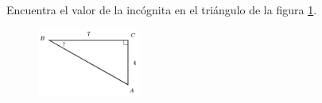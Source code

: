 \question[15]  Encuentra el valor de la incógnita en el triángulo de la figura \ref{fig:angle_functrig_23}.
\begin{figure}[H]
    \begin{center}
        \includegraphics[width=0.3\textwidth]{../images/angle_functrig_23.png}
    \end{center}
    \caption{}
    \label{fig:angle_functrig_23}
\end{figure}